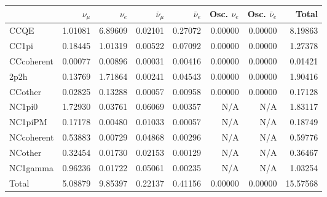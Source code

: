 \begin{tabular} { | l ||r | r | r | r | r | r | | r | }
\hline
              & $\nu_\mu$            & $\nu_e$              & $\bar{\nu}_{\mu}$    & $\bar{\nu}_{e}$      & Osc. $\nu_e$         & Osc. $\bar{\nu}_{e}$ & Total                \\ \hline\hline
 CCQE         & 1.01081              & 6.89609              & 0.02101              & 0.27072              & 0.00000              & 0.00000              & 8.19863              \\ \hline
 CC1pi        & 0.18445              & 1.01319              & 0.00522              & 0.07092              & 0.00000              & 0.00000              & 1.27378              \\ \hline
 CCcoherent   & 0.00077              & 0.00896              & 0.00031              & 0.00416              & 0.00000              & 0.00000              & 0.01421              \\ \hline
 2p2h         & 0.13769              & 1.71864              & 0.00241              & 0.04543              & 0.00000              & 0.00000              & 1.90416              \\ \hline
 CCother      & 0.02825              & 0.13288              & 0.00057              & 0.00958              & 0.00000              & 0.00000              & 0.17128              \\ \hline
 NC1pi0       & 1.72930              & 0.03761              & 0.06069              & 0.00357              & N/A                  & N/A                  & 1.83117              \\ \hline
 NC1piPM      & 0.17178              & 0.00480              & 0.01033              & 0.00057              & N/A                  & N/A                  & 0.18749              \\ \hline
 NCcoherent   & 0.53883              & 0.00729              & 0.04868              & 0.00296              & N/A                  & N/A                  & 0.59776              \\ \hline
 NCother      & 0.32454              & 0.01730              & 0.02153              & 0.00129              & N/A                  & N/A                  & 0.36467              \\ \hline
 NC1gamma     & 0.96236              & 0.01722              & 0.05061              & 0.00235              & N/A                  & N/A                  & 1.03254              \\ \hline
\hline
 Total        & 5.08879              & 9.85397              & 0.22137              & 0.41156              & 0.00000              & 0.00000              & 15.57568             \\ \hline

\end{tabular}
